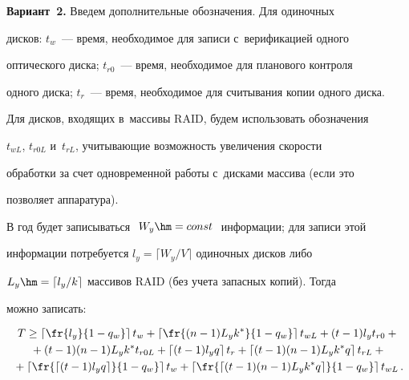   


  \noindent


  \textbf{Вариант~2.} Введем дополнительные обозначения. Для одиночных 


дисков: $t_w$~--- время, необходимое для записи с~верификацией одного 


оптического диска; $t_{r0}$~--- время, необходимое для планового контроля 


одного диска; $t_r$~--- время, необходимое для считывания копии одного диска. 


Для дисков, входящих в~массивы RAID, будем использовать обозначения 


$t_{wL}$, $t_{r0L}$ и~$t_{rL}$, учитывающие возможность увеличения скорости 


обработки за счет одновременной работы с~дисками массива (если это 


позволяет аппаратура).


  


  В год будет записываться\ \,$W_y\hm = const$\ \,информации; для записи этой 


информации потребуется $l_y\!=\!\lceil W_y/V\rceil$ одиночных дисков либо 


$L_y\hm= \lceil l_y/k\rceil$ массивов RAID (без учета запасных копий). Тогда 


можно записать:


  \begin{multline}


  T\geq \left\lceil \fr{l_y}{1-q_w}\right\rceil t_w +\left\lceil \fr{(n-1)L_y k^*}{1-


q_w}\right\rceil t_{wL} +(t-1)l_y t_{r0} +{}\\


{}+(t-1) (n-1) L_y k^* t_{r0L}+


 \left\lceil (t-1) l_y q\right\rceil t_r +\left\lceil (t-1)(n-1) L_y k^* q\right\rceil t_{rL}+{}\\


 {}+


  \left\lceil \fr{\lceil (t-1)l_y q\rceil}{1-q_w}\right\rceil t_w + \left\lceil \fr{\lceil (t-


1)(n-1) L_y k^* q\rceil}{1-q_w}\right\rceil t_{wL}\,.


  \label{e2-che}


  \end{multline}


  


